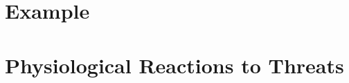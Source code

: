 


%


\pagestyle{empty}


\cleardoublepage	
\pagestyle{fancy}
\setcounter{page}{1}
%
%


\setcounter{page}{1}

\renewcommand{\cleardoublepage}{}
\chapter{Example}

\chapter{Physiological Reactions to Threats}







